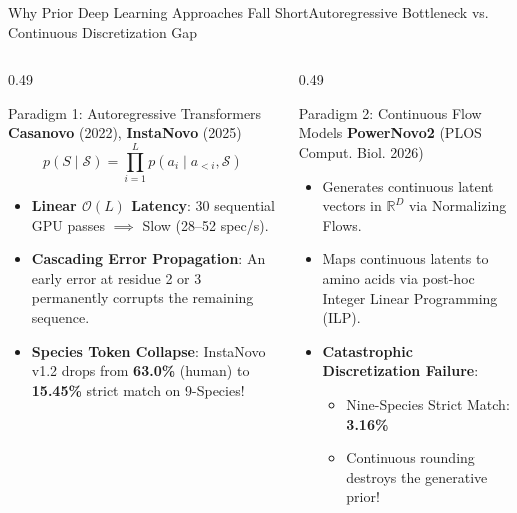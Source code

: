 \documentclass[aspectratio=169, 10pt]{beamer}
\begin{document}
\begin{frame}{Why Prior Deep Learning Approaches Fall Short}{Autoregressive Bottleneck vs. Continuous Discretization Gap}
\begin{columns}[T]
\begin{column}{0.49\textwidth}
  \begin{block}{\scriptsize Paradigm 1: Autoregressive Transformers}
    \scriptsize\textbf{Casanovo} (2022), \textbf{InstaNovo} (2025)
    \begin{equation*}
      p(S \mid \mathcal{S}) = \prod_{i=1}^L p(a_i \mid a_{<i}, \mathcal{S})
    \end{equation*}
    \vspace{-0.25cm}
    \begin{itemize}\setlength{\itemsep}{1pt}\tiny
      \item \textbf{Linear $\mathcal{O}(L)$ Latency}: 30 sequential GPU passes $\implies$ Slow (28--52 spec/s).
      \item \textbf{Cascading Error Propagation}: An early error at residue 2 or 3 permanently corrupts the remaining sequence.
      \item \textbf{Species Token Collapse}: InstaNovo v1.2 drops from \textbf{63.0\%} (human) to \textbf{15.45\%} strict match on 9-Species!
    \end{itemize}
  \end{block}
\end{column}

\begin{column}{0.49\textwidth}
  \begin{alertblock}{\scriptsize Paradigm 2: Continuous Flow Models}
    \scriptsize\textbf{PowerNovo2} (PLOS Comput. Biol. 2026)
    \begin{itemize}\setlength{\itemsep}{1pt}\tiny
      \item Generates continuous latent vectors in $\mathbb{R}^D$ via Normalizing Flows.
      \item Maps continuous latents to amino acids via post-hoc Integer Linear Programming (ILP).
      \item \textbf{Catastrophic Discretization Failure}:
      \begin{itemize}\tiny
        \item Nine-Species Strict Match: \textbf{3.16\%}
        \item Continuous rounding destroys the generative prior!
      \end{itemize}
    \end{itemize}
  \end{alertblock}
\end{column}
\end{columns}


\end{frame}
\end{document}
